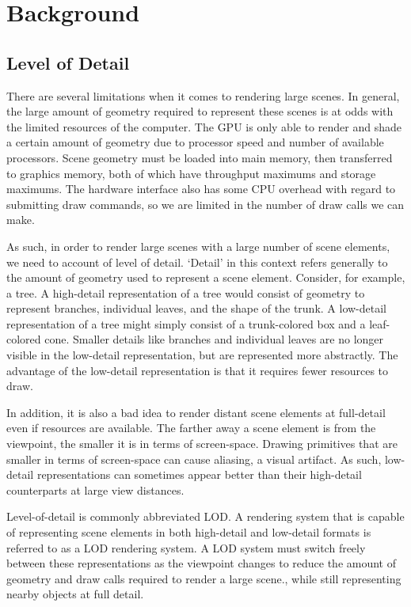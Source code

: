 
\chapter{Background}



\section{Level of Detail}

There are several limitations when it comes to rendering large scenes.
In general, the large amount of geometry required to represent these scenes is at odds with the limited resources of the computer.
The GPU is only able to render and shade a certain amount of geometry due to processor speed and number of available processors.
Scene geometry must be loaded into main memory, then transferred to graphics memory, both of which have throughput maximums and storage maximums.
The hardware interface also has some CPU overhead with regard to submitting draw commands, so we are limited in the number of draw calls we can make.

As such, in order to render large scenes with a large number of scene elements, we need to account of level of detail.
`Detail' in this context refers generally to the amount of geometry used to represent a scene element.
Consider, for example, a tree.
A high-detail representation of a tree would consist of geometry to represent branches, individual leaves, and the shape of the trunk.
A low-detail representation of a tree might simply consist of a trunk-colored box and a leaf-colored cone.
Smaller details like branches and individual leaves are no longer visible in the low-detail representation, but are represented more abstractly.
The advantage of the low-detail representation is that it requires fewer resources to draw.

In addition, it is also a bad idea to render distant scene elements at full-detail even if resources are available.
The farther away a scene element is from the viewpoint, the smaller it is in terms of screen-space.
Drawing primitives that are smaller in terms of screen-space can cause aliasing, a visual artifact.
As such, low-detail representations can sometimes appear better than their high-detail counterparts at large view distances.

Level-of-detail is commonly abbreviated LOD.
A rendering system that is capable of representing scene elements in both high-detail and low-detail formats is referred to as a LOD rendering system.
A LOD system must switch freely between these representations as the viewpoint changes to reduce the amount of geometry and draw calls required to render a large scene., while still representing nearby objects at full detail.


